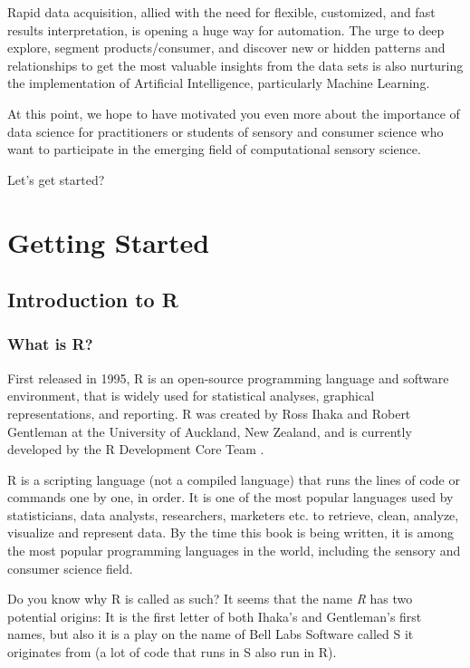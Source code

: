\documentclass[
]{krantz}
\renewenvironment{quote}{\begin{VF}}{\end{VF}}
\begin{document}
Rapid data acquisition, allied with the need for flexible, customized, and fast results interpretation, is opening a huge way for automation. The urge to deep explore, segment products/consumer, and discover new or hidden patterns and relationships to get the most valuable insights from the data sets is also nurturing the implementation of Artificial Intelligence, particularly Machine Learning.

At this point, we hope to have motivated you even more about the importance of data science for practitioners or students of sensory and consumer science who want to participate in the emerging field of computational sensory science.

Let's get started?

\hypertarget{start-R}{%
\chapter{Getting Started}\label{start-R}}

\hypertarget{introduction-to-r}{%
\section{Introduction to R}\label{introduction-to-r}}

\hypertarget{what-is-r}{%
\subsection{What is R?}\label{what-is-r}}

First released in 1995, R is an open-source programming language and software environment, that is widely used for statistical analyses, graphical representations, and reporting. R was created by Ross Ihaka and Robert Gentleman at the University of Auckland, New Zealand, and is currently developed by the R Development Core Team \citep{Rmanual}.

R is a scripting language (not a compiled language) that runs the lines of code or commands one by one, in order. It is one of the most popular languages used by statisticians, data analysts, researchers, marketers etc. to retrieve, clean, analyze, visualize and represent data. By the time this book is being written, it is among the most popular programming languages in the world, including the sensory and consumer science field.

\begin{quote}
Do you know why R is called as such?
It seems that the name \emph{R} has two potential origins: It is the first letter of both Ihaka's and Gentleman's first names, but also it is a play on the name of Bell Labs Software called S it originates from (a lot of code that runs in S also run in R).
\end{quote}
\end{document}
